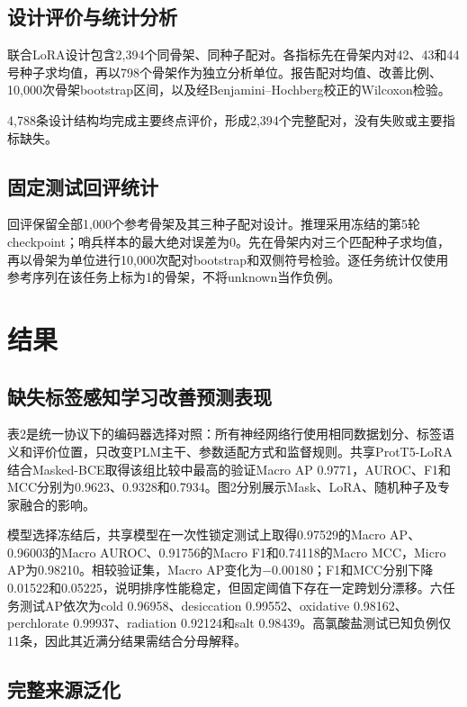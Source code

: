 \documentclass[conference]{IEEEtran}
\begin{document}
\subsection{设计评价与统计分析}

联合LoRA设计包含2,394个同骨架、同种子配对。各指标先在骨架内对42、43和44号种子求均值，再以798个骨架作为独立分析单位。报告配对均值、改善比例、10,000次骨架bootstrap区间，以及经Benjamini--Hochberg校正的Wilcoxon检验。

4,788条设计结构均完成主要终点评价，形成2,394个完整配对，没有失败或主要指标缺失。

\subsection{固定测试回评统计}

回评保留全部1,000个参考骨架及其三种子配对设计。推理采用冻结的第5轮checkpoint；哨兵样本的最大绝对误差为0。先在骨架内对三个匹配种子求均值，再以骨架为单位进行10,000次配对bootstrap和双侧符号检验。逐任务统计仅使用参考序列在该任务上标为1的骨架，不将unknown当作负例。

\section{结果}\label{sec:results}

\subsection{缺失标签感知学习改善预测表现}

表2是统一协议下的编码器选择对照：所有神经网络行使用相同数据划分、标签语义和评价位置，只改变PLM主干、参数适配方式和监督规则。共享ProtT5-LoRA结合Masked-BCE取得该组比较中最高的验证Macro AP 0.9771，AUROC、F1和MCC分别为0.9623、0.9328和0.7934。图2分别展示Mask、LoRA、随机种子及专家融合的影响。

模型选择冻结后，共享模型在一次性锁定测试上取得0.97529的Macro AP、0.96003的Macro AUROC、0.91756的Macro F1和0.74118的Macro MCC，Micro AP为0.98210。相较验证集，Macro AP变化为$-0.00180$；F1和MCC分别下降0.01522和0.05225，说明排序性能稳定，但固定阈值下存在一定跨划分漂移。六任务测试AP依次为cold 0.96958、desiccation 0.99552、oxidative 0.98162、perchlorate 0.99937、radiation 0.92124和salt 0.98439。高氯酸盐测试已知负例仅11条，因此其近满分结果需结合分母解释。

\subsection{完整来源泛化}
\end{document}
